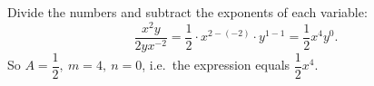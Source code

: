 Divide the numbers and subtract the exponents of each variable:
\[
\dfrac{x^2y}{2yx^{-2}}=\dfrac{1}{2}\cdot x^{2-(-2)}\cdot y^{1-1}=\dfrac{1}{2}x^4y^0 .
\]
So $\boxed{A=\dfrac{1}{2},\ m=4,\ n=0}$, i.e.\ the expression equals $\dfrac{1}{2}x^4$.
